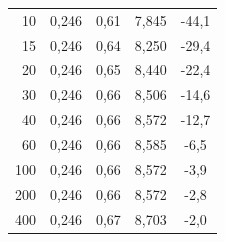 \documentclass[a4paper, czech]{article}
\begin{document}
\begin{table}[H]
\begin{tabular}{rcccc}
        10         & 0,246                                                                       & 0,61                           & 7,845                                                        & -44,1                                                       \\
        15         & 0,246                                                                       & 0,64                           & 8,250                                                        & -29,4                                                       \\
        20         & 0,246                                                                       & 0,65                           & 8,440                                                        & -22,4                                                       \\
        30         & 0,246                                                                       & 0,66                           & 8,506                                                        & -14,6                                                       \\
        40         & 0,246                                                                       & 0,66                           & 8,572                                                        & -12,7                                                       \\
        60         & 0,246                                                                       & 0,66                           & 8,585                                                        & -6,5                                                        \\
        100        & 0,246                                                                       & 0,66                           & 8,572                                                        & -3,9                                                        \\
        200        & 0,246                                                                       & 0,66                           & 8,572                                                        & -2,8                                                        \\
        400        & 0,246                                                                       & 0,67                           & 8,703                                                        & -2,0                                                        \\

\end{tabular}
\end{table}
\end{document}
